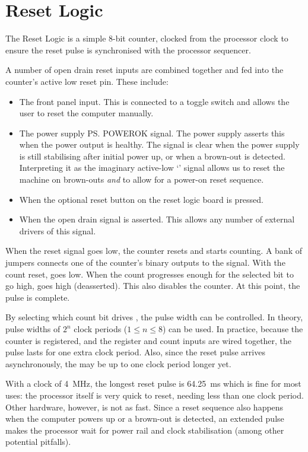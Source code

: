 \section{Reset Logic}

The Reset Logic is a simple 8-bit counter, clocked from the processor clock to
ensure the reset pulse is synchronised with the processor sequencer.

A number of open drain reset inputs are combined together and fed into the
counter's active low reset pin. These include:

\begin{itemize}
\item The front panel  input. This is connected to a toggle switch
  and allows the user to reset the computer manually.
\item The power supply \ps{POWEROK} signal. The power supply asserts this when
  the power output is healthy. The signal is clear when the power supply is
  still stabilising after initial power up, or when a brown-out is
  detected. Interpreting it as the imaginary active-low ‘’ signal
  allows us to reset the machine on brown-outs {\em and\/} to allow for a
  power-on reset sequence.
\item When the optional reset button on the reset logic board is pressed.
\item When the open drain  signal is asserted. This allows any number
  of external drivers of this signal.
\end{itemize}

When the reset signal goes low, the counter resets and starts counting. A bank
of jumpers connects one of the counter's binary outputs to the 
signal. With the count reset,  goes low. When the count progresses
enough for the selected bit to go high,  goes high
(deasserted). This also disables the counter. At this point, the 
pulse is complete.

By selecting which count bit drives , the pulse width can be controlled. In
theory, pulse widths of $2^n$ clock periods ($1\leq n\leq 8$) can be used. In practice,
because the counter is registered, and the register and count inputs are wired together,
the  pulse lasts for one extra clock period. Also, since the reset pulse
arrives asynchronously, the  may be up to one clock period longer yet.

With a clock of 4~MHz, the longest reset pulse is 64.25~ms which is fine for most uses:
the processor itself is very quick to reset, needing less than one clock period. Other
hardware, however, is not as fast. Since a reset sequence also happens when the computer
powers up or a brown-out is detected, an extended  pulse makes the processor
wait for power rail and clock stabilisation (among other potential pitfalls).

